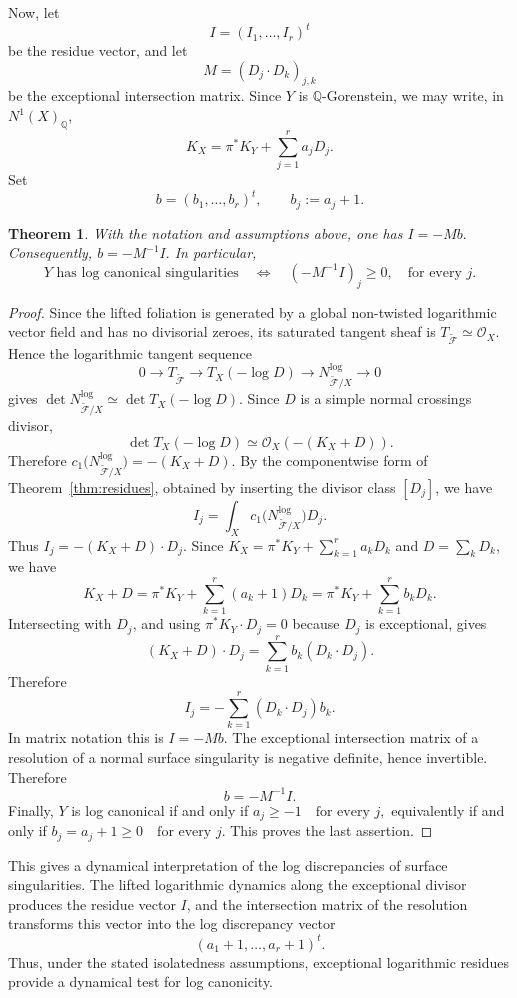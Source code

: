 \documentclass[12pt,reqno,a4paper]{amsart}
\numberwithin{equation}{section}
\theoremstyle{plain}
\newtheorem{theorem}{Theorem}[section]
\theoremstyle{definition}
\newcommand{\cF}{\mathcal{F}}
\begin{document}
Now, let
\[
I=(I_1,\ldots,I_r)^t
\]
be the residue vector, and let
\[
M=(D_j\cdot D_k)_{j,k}
\]
be the exceptional intersection matrix. Since \(Y\) is \(\mathbb Q\)-Gorenstein,
we may write, in \(N^1(X)_{\mathbb Q}\),
\[
K_X=\pi^*K_Y+\sum_{j=1}^r a_jD_j.
\]
Set
\[
b=(b_1,\ldots,b_r)^t,
\qquad
b_j:=a_j+1.
\]

\begin{theorem} 
\label{thm:exceptional-residues-discrepancies}
With the notation and assumptions above, one has
$
I=-Mb.
$
Consequently,
$
b=-M^{-1}I.
$
In particular,
\[
Y\text{ has log canonical singularities}
\quad\Longleftrightarrow\quad
(-M^{-1}I)_j\ge0, 
\quad\text{for every }j.
\]
\end{theorem}

\begin{proof}
Since the lifted foliation is generated by a global non-twisted logarithmic
vector field and has no divisorial zeroes, its saturated tangent sheaf is
$
T_{\widetilde{\cF}}\simeq \mathcal O_X.
$
Hence the logarithmic tangent sequence
\[
0\longrightarrow T_{\widetilde{\cF}}
\longrightarrow T_X(-\log D)
\longrightarrow N^{\log}_{\widetilde{\cF}/X}
\longrightarrow 0
\]
gives $
\det N^{\log}_{\widetilde{\cF}/X}
\simeq
\det T_X(-\log D).
$
Since \(D\) is a simple normal crossings divisor,
\[
\det T_X(-\log D)
\simeq
\mathcal O_X(-(K_X+D)).
\]
Therefore
$
c_1\bigl(N^{\log}_{\widetilde{\cF}/X}\bigr)=-(K_X+D).
$
By the componentwise form of Theorem~\ref{thm:residues}, obtained by inserting
the divisor class \([D_j]\), we have
\[
I_j
=
\int_X c_1\bigl(N^{\log}_{\widetilde{\cF}/X}\bigr)D_j.
\]
Thus
$
I_j=-(K_X+D)\cdot D_j.
$
Since
$
K_X=\pi^*K_Y+\sum_{k=1}^r a_kD_k $
and \(D=\sum_kD_k\), we have
\[
K_X+D
=
\pi^*K_Y+\sum_{k=1}^r(a_k+1)D_k
=
\pi^*K_Y+\sum_{k=1}^r b_kD_k.
\]
Intersecting with \(D_j\), and using
$
\pi^*K_Y\cdot D_j=0
$
because \(D_j\) is exceptional, gives
\[
(K_X+D)\cdot D_j
=
\sum_{k=1}^r b_k(D_k\cdot D_j).
\]
Therefore
\[
I_j
=
-\sum_{k=1}^r(D_k\cdot D_j)b_k.
\]
In matrix notation this is
$
I=-Mb. $
The exceptional intersection matrix of a resolution of a normal surface
singularity is negative definite, hence invertible. Therefore
\[
b=-M^{-1}I.
\]
Finally, \(Y\) is log canonical if and only if
$
a_j\ge -1
\quad\text{for every }j, $
equivalently if and only if
$
b_j=a_j+1\ge0
\quad\text{for every }j.
$
This proves the last assertion.
\end{proof}

 
This  gives a dynamical interpretation of the log discrepancies of
surface singularities. The lifted logarithmic dynamics along the exceptional
divisor produces the residue vector \(I\), and the intersection matrix of the
resolution transforms this vector into the log discrepancy vector
\[
(a_1+1,\ldots,a_r+1)^t.
\]
Thus, under the stated isolatedness assumptions, exceptional logarithmic
residues provide a dynamical test for log canonicity.
 
\end{document}
